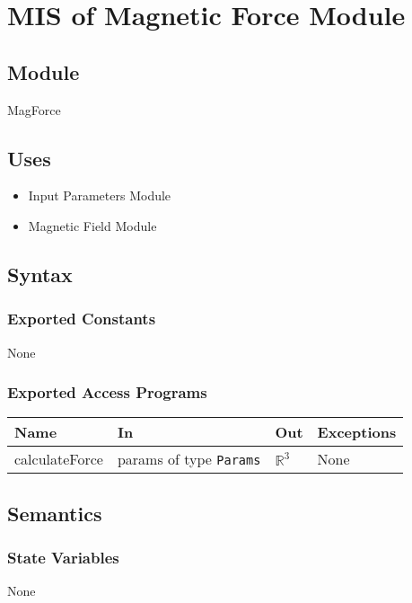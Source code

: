 \documentclass[12pt, titlepage]{article}
\begin{document}
\newpage

\section{MIS of Magnetic Force Module} \label{MISMagForce}

\subsection{Module}
MagForce 

\subsection{Uses}
\begin{itemize}
  \item Input Parameters Module 
  \item Magnetic Field Module
\end{itemize}

\subsection{Syntax}

\subsubsection{Exported Constants}
None 

\subsubsection{Exported Access Programs}
\begin{center}
  \begin{tabular}{p{3cm} p{4cm} p{4cm} p{3cm}}
  \hline
  \textbf{Name} & \textbf{In} & \textbf{Out} & \textbf{Exceptions} \\
  \hline
  calculateForce & params of type \texttt{Params} & $\mathbb{R}^3$ & None \\
  \hline
  \end{tabular}
  \end{center}

\subsection{Semantics}

\subsubsection{State Variables}
None
\end{document}
